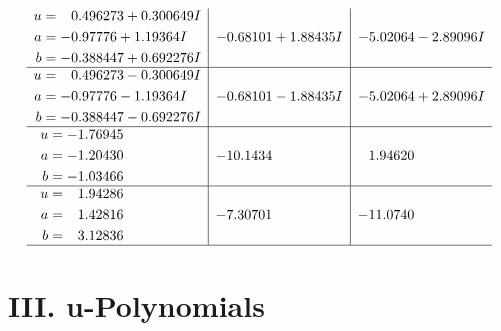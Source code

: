 \documentclass[1p]{elsarticle_modified}
\theoremstyle{definition}
\begin{document}
$$\begin{array}{c|c|c}
\begin{aligned}
u &= \phantom{-}0.496273 + 0.300649 I \\
a &= -0.97776 + 1.19364 I \\
b &= -0.388447 + 0.692276 I\end{aligned}
 & -0.68101 + 1.88435 I & -5.02064 - 2.89096 I \\ \hline\begin{aligned}
u &= \phantom{-}0.496273 - 0.300649 I \\
a &= -0.97776 - 1.19364 I \\
b &= -0.388447 - 0.692276 I\end{aligned}
 & -0.68101 - 1.88435 I & -5.02064 + 2.89096 I \\ \hline\begin{aligned}
u &= -1.76945\phantom{ +0.000000I} \\
a &= -1.20430\phantom{ +0.000000I} \\
b &= -1.03466\phantom{ +0.000000I}\end{aligned}
 & -10.1434\phantom{ +0.000000I} & \phantom{-}1.94620\phantom{ +0.000000I} \\ \hline\begin{aligned}
u &= \phantom{-}1.94286\phantom{ +0.000000I} \\
a &= \phantom{-}1.42816\phantom{ +0.000000I} \\
b &= \phantom{-}3.12836\phantom{ +0.000000I}\end{aligned}
 & -7.30701\phantom{ +0.000000I} & -11.0740\phantom{ +0.000000I}\\
 \hline 
 \end{array}$$\newpage
\newpage\renewcommand{\arraystretch}{1}
\centering \section*{ III. u-Polynomials}
\end{document}
